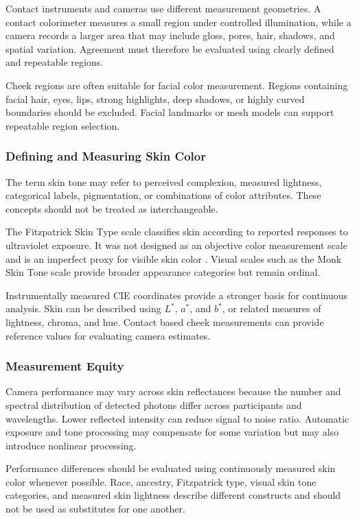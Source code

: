 \documentclass[12pt]{article}
\begin{document}
Contact instruments and cameras use different measurement geometries. A contact colorimeter measures a small region under controlled illumination, while a camera records a larger area that may include gloss, pores, hair, shadows, and spatial variation. Agreement must therefore be evaluated using clearly defined and repeatable regions.

Cheek regions are often suitable for facial color measurement. Regions containing facial hair, eyes, lips, strong highlights, deep shadows, or highly curved boundaries should be excluded. Facial landmarks or mesh models can support repeatable region selection.

\subsubsection{Defining and Measuring Skin Color}

The term skin tone may refer to perceived complexion, measured lightness, categorical labels, pigmentation, or combinations of color attributes. These concepts should not be treated as interchangeable.

The Fitzpatrick Skin Type scale classifies skin according to reported responses to ultraviolet exposure. It was not designed as an objective color measurement scale and is an imperfect proxy for visible skin color \cite{gupta2019}. Visual scales such as the Monk Skin Tone scale provide broader appearance categories but remain ordinal.

Instrumentally measured CIE coordinates provide a stronger basis for continuous analysis. Skin can be described using \(L^*\), \(a^*\), and \(b^*\), or related measures of lightness, chroma, and hue. Contact based cheek measurements can provide reference values for evaluating camera estimates.

\subsubsection{Measurement Equity}

Camera performance may vary across skin reflectances because the number and spectral distribution of detected photons differ across participants and wavelengths. Lower reflected intensity can reduce signal to noise ratio. Automatic exposure and tone processing may compensate for some variation but may also introduce nonlinear processing.

Performance differences should be evaluated using continuously measured skin color whenever possible. Race, ancestry, Fitzpatrick type, visual skin tone categories, and measured skin lightness describe different constructs and should not be used as substitutes for one another.
\end{document}
